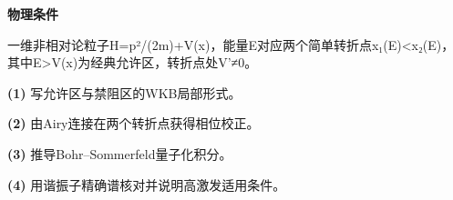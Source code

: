 \textbf{物理条件}\par 一维非相对论粒子H=p²/(2m)+V(x)，能量E对应两个简单转折点x₁(E)<x₂(E)，其中E>V(x)为经典允许区，转折点处V'≠0。
\par\noindent\textbf{(1)} 写允许区与禁阻区的WKB局部形式。
\par\noindent\textbf{(2)} 由Airy连接在两个转折点获得相位校正。
\par\noindent\textbf{(3)} 推导Bohr–Sommerfeld量子化积分。
\par\noindent\textbf{(4)} 用谐振子精确谱核对并说明高激发适用条件。
